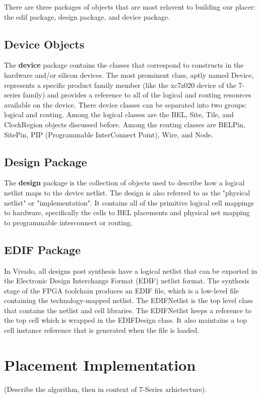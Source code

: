 \documentclass[twocolumn]{article}
\begin{document}
    There are three packages of objects that are most relavent to building our placer: the edif package, design package, and device package. 

    \subsection{Device Objects}
    The \textbf{device} package contains the classes that correspond to constructs in the hardware and/or silicon devices. 
    The most prominent class, aptly named Device, represents a specific product family member (like the xc7z020 device of the 7-series family) and provides a reference to all of the logical and routing resources available on the device. 
    There device classes can be separated into two groups: logical and routing. 
    Among the logical classes are the BEL, Site, Tile, and ClockRegion objects discussed before. 
    Among the routing classes are BELPin, SitePin, PIP (Programmable InterConnect Point), Wire, and Node. 

    \subsection{Design Package}
    The \textbf{design} package is the collection of objects used to describe how a logical netlist maps to the device netlist. 
    The design is also referred to as the "physical netlist" or "implementation". 
    It contains all of the primitive logical cell mappings to hardware, specifically the cells to BEL placements and physical net mapping to programmable interconnect or routing. 

    \subsection{EDIF Package}
    In Vivado, all designs post synthesis have a logical netlist that can be exported in the Electronic Design Interchange Format (EDIF) netlist format.
    The synthesis stage of the FPGA toolchain produces an EDIF file, which is a low-level file containing the technology-mapped netlist.
    The EDIFNetlist is the top level class that contains the netlist and cell libraries. 
    The EDIFNetlist keeps a reference to the top cell which is wrapped in the EDIFDesign class. 
    It also maintains a top cell instance reference that is generated when the file is loaded. 


\section{Placement Implementation}
    (Describe the algorithm, then in context of 7-Series arhictecture). \\
\end{document}
